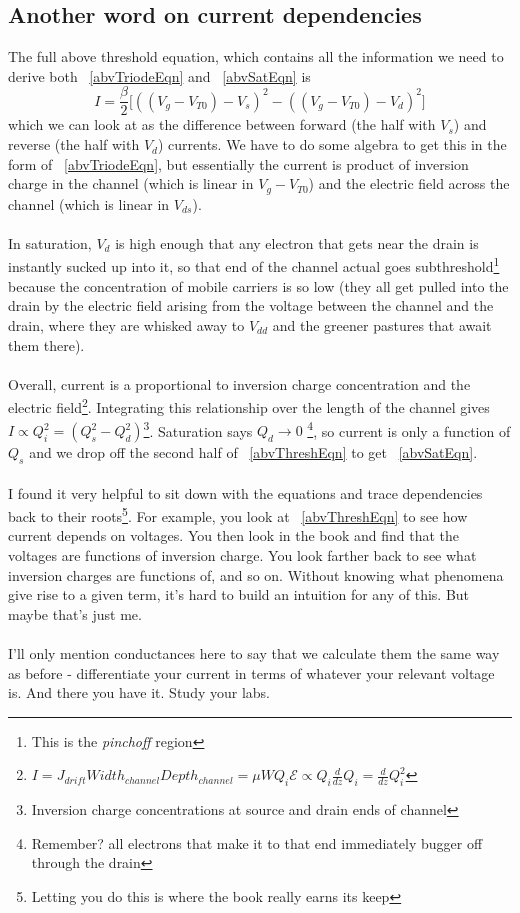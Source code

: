 \subsection{Another word on current dependencies}
The full above threshold equation, which contains all the information we need to derive both ~\eqref{abvTriodeEqn} and ~\eqref{abvSatEqn} is
\begin{equation}
I = \frac{\beta}{2}\big[((V_g - V_{T0}) - V_s)^2 - ((V_g - V_{T0}) - V_d)^2\big] \label{abvThreshEqn}
\end{equation}
which we can look at as the difference between forward (the half with $V_s$) and reverse (the half with $V_d$) currents. We have to do some algebra to get this in the form of ~\eqref{abvTriodeEqn}, but essentially the current is product of inversion charge in the channel (which is linear in $V_g - V_{T0}$) and the electric field across the channel (which is linear in $V_{ds}$).\\ \\
In saturation, $V_d$ is high enough that any electron that gets near the drain is instantly sucked up into it, so that end of the channel actual goes subthreshold\footnote{This is the \textsl{pinchoff} region} because the concentration of mobile carriers is so low (they all get pulled into the drain by the electric field arising from the voltage between the channel and the drain, where they are whisked away to $V_{dd}$ and the greener pastures that await them there).\\ \\
Overall, current is a proportional to inversion charge concentration  and the electric field\footnote{$I = J_{drift}Width_{channel}Depth_{channel} = \mu W Q_i \mathcal{E} \propto Q_i \frac{d}{dz}Q_i = \frac{d}{dz}Q_i^2$}. Integrating this relationship over the length of the channel gives $I \propto Q_i^2 = (Q_s^2 - Q_d^2)$\footnote{Inversion charge concentrations at source and drain ends of channel}. Saturation says $Q_d \to 0$ \footnote{Remember? all electrons that make it to that end immediately bugger off through the drain}, so current is only a function of $Q_s$ and we drop off the second half of ~\eqref{abvThreshEqn} to get ~\eqref{abvSatEqn}. \\ \\
I found it very helpful to sit down with the equations and trace dependencies back to their roots\footnote{Letting you do this is where the book really earns its keep}. For example, you look at ~\eqref{abvThreshEqn} to see how current depends on voltages. You then look in the book and find that the voltages are functions of inversion charge. You look farther back to see what inversion charges are functions of, and so on. Without knowing what phenomena give rise to a given term, it's hard to build an intuition for any of this. But maybe that's just me.\\ \\
I'll only mention conductances here to say that we calculate them the same way as before - differentiate your current in terms of whatever your relevant voltage is. And there you have it. Study your labs.




